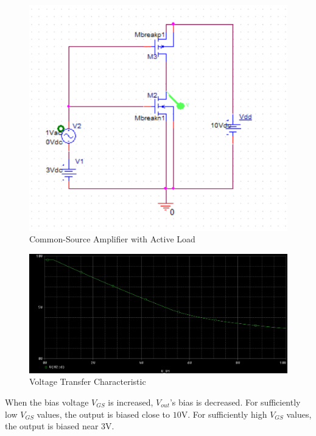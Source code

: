 \FloatBarrier

\begin{figure}[h!]
	\centering
	\includegraphics[scale=0.75]{./images/circuit4.PNG}
	\caption{Common-Source Amplifier with Active Load}
	\label{fig:circuit4}
\end{figure}

\FloatBarrier

\FloatBarrier

\begin{figure}[h!]
	\centering
	\includegraphics[scale=0.50]{./images/dc_sweep.PNG}
	\caption{Voltage Transfer Characteristic}
	\label{fig:dc_sweep}
\end{figure}

\FloatBarrier

When the bias voltage $V_{GS}$ is increased, $V_{out}$'s bias is decreased. For sufficiently low $V_{GS}$ values, the output is biased close to $10$\si{\volt}. For sufficiently high $V_{GS}$ values, the output is biased near $3$\si{\volt}.

